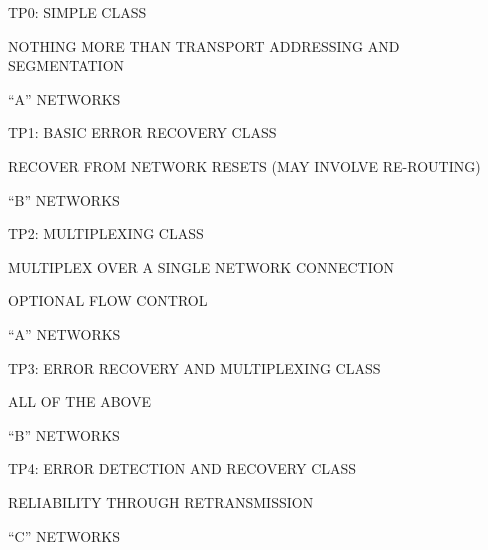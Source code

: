 \begin{bwslide}

\begin{nrtc}
\item	TP0: SIMPLE CLASS
    \begin{nrtc}
    \item	NOTHING MORE THAN TRANSPORT ADDRESSING AND SEGMENTATION

    \item	``A'' NETWORKS
    \end{nrtc}

\item	TP1: BASIC ERROR RECOVERY CLASS
    \begin{nrtc}
    \item	RECOVER FROM NETWORK RESETS (MAY INVOLVE RE-ROUTING)

    \item	``B'' NETWORKS
    \end{nrtc}
\end{nrtc}
\end{bwslide}


\begin{bwslide}

\begin{nrtc}
\item	TP2: MULTIPLEXING CLASS
    \begin{nrtc}
    \item	MULTIPLEX OVER A SINGLE NETWORK CONNECTION

    \item	OPTIONAL FLOW CONTROL	

    \item	``A'' NETWORKS
    \end{nrtc}

\item	TP3: ERROR RECOVERY AND MULTIPLEXING CLASS
    \begin{nrtc}
    \item	ALL OF THE ABOVE

    \item	``B'' NETWORKS
    \end{nrtc}
\end{nrtc}
\end{bwslide}


\begin{bwslide}

\begin{nrtc}
\item	TP4: ERROR DETECTION AND RECOVERY CLASS
    \begin{nrtc}
    \item	RELIABILITY THROUGH RETRANSMISSION

    \item	``C'' NETWORKS
    \end{nrtc}
\end{nrtc}
\end{bwslide}


